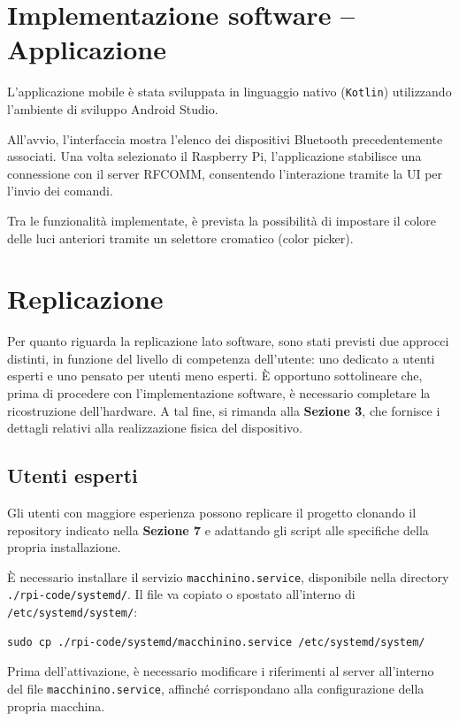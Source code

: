 \documentclass{article}
\begin{document}
\section{Implementazione software – Applicazione}

L’applicazione mobile è stata sviluppata in linguaggio nativo (\texttt{Kotlin}) utilizzando l’ambiente di sviluppo Android Studio.

All’avvio, l’interfaccia mostra l’elenco dei dispositivi Bluetooth precedentemente associati. Una volta selezionato il Raspberry Pi, l’applicazione stabilisce una connessione con il server RFCOMM, consentendo l’interazione tramite la UI per l’invio dei comandi.

Tra le funzionalità implementate, è prevista la possibilità di impostare il colore delle luci anteriori tramite un selettore cromatico (color picker).

\section{Replicazione}
Per quanto riguarda la replicazione lato software, sono stati previsti due approcci distinti, in funzione del livello di competenza dell’utente: uno dedicato a utenti esperti e uno pensato per utenti meno esperti.
\newline
È opportuno sottolineare che, prima di procedere con l’implementazione software, è necessario completare la ricostruzione dell’hardware. A tal fine, si rimanda alla \textbf{Sezione 3}, che fornisce i dettagli relativi alla realizzazione fisica del dispositivo.
\subsection{Utenti esperti}

Gli utenti con maggiore esperienza possono replicare il progetto clonando il repository indicato nella \textbf{Sezione 7} e adattando gli script alle specifiche della propria installazione.

È necessario installare il servizio \texttt{macchinino.service}, disponibile nella directory \texttt{./rpi-code/systemd/}. Il file va copiato o spostato all’interno di \texttt{/etc/systemd/system/}:

\begin{verbatim}
sudo cp ./rpi-code/systemd/macchinino.service /etc/systemd/system/
\end{verbatim}

Prima dell’attivazione, è necessario modificare i riferimenti al server all’interno del file \texttt{macchinino.service}, affinché corrispondano alla configurazione della propria macchina.
\end{document}
